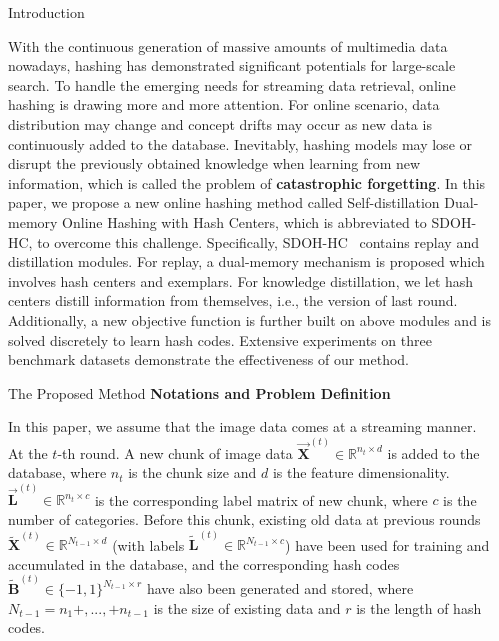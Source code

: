 \documentclass[final]{beamer}
\newlength{\sepwidth}
\newlength{\colwidth}
\newcommand{\separatorcolumn}{\begin{column}{\sepwidth}\end{column}}
\newcommand{\mymethodname}{SDOH-HC}
\begin{document}
	\begin{frame}[t]
		\begin{columns}[t]
			\separatorcolumn
			
			\begin{column}{\colwidth}
				
				\begin{block}{Introduction}
					
					With the continuous generation of massive amounts of multimedia data nowadays, hashing has demonstrated significant potentials for large-scale search. To handle the emerging needs for streaming data retrieval, online hashing is drawing more and more attention. For online scenario, data distribution may change and concept drifts may occur as new data is continuously added to the database. Inevitably, hashing models may lose or disrupt the previously obtained knowledge when learning from new information, which is called the problem of \textbf{catastrophic forgetting}. In this paper, we propose a new online hashing method called Self-distillation Dual-memory Online Hashing with Hash Centers, which is abbreviated to \mymethodname, to overcome this challenge. Specifically, \mymethodname~ contains replay and distillation modules. For replay, a dual-memory mechanism is proposed which involves hash centers and exemplars. For knowledge distillation, we let hash centers distill information from themselves, i.e., the version of last round. Additionally, a new objective function is further built on above modules and is solved discretely to learn hash codes. Extensive experiments on three benchmark datasets demonstrate the effectiveness of our method.
					
				\end{block}
				
				\begin{block}{The Proposed Method}
					\textbf{Notations and Problem Definition}
					
					In this paper, we assume that the image data comes at a streaming manner. At the $t$-th round. A new chunk of image data $ \vec{\mathbf{X}}^{(t)} \in \mathbb{R}^{n_t \times d}$ is added to the database, where $n_t$ is the chunk size and $d$ is the feature dimensionality. $ \vec{\mathbf{L}}^{(t)} \in \mathbb{R}^{n_t \times c}$ is the corresponding label matrix of new chunk, where $c$ is the number of categories. Before this chunk, existing old data at previous rounds $\tilde{\mathbf{X}}^{(t)} \in \mathbb{R}^{N_{t-1} \times d}$ (with labels $\tilde{\mathbf{L}}^{(t)} \in \mathbb{R}^{N_{t-1} \times c}$) have been used for training and accumulated in the database, and the corresponding hash codes $\tilde{\mathbf{B}}^{(t)} \in \{-1, 1\}^{N_{t-1} \times r} $ have also been generated and stored, where $N_{t-1} = n_1+,...,+n_{t-1}$ is the size of existing data and $r$ is the length of hash codes.
					

\end{block}
\end{column}
\end{columns}
\end{frame}
\end{document}
